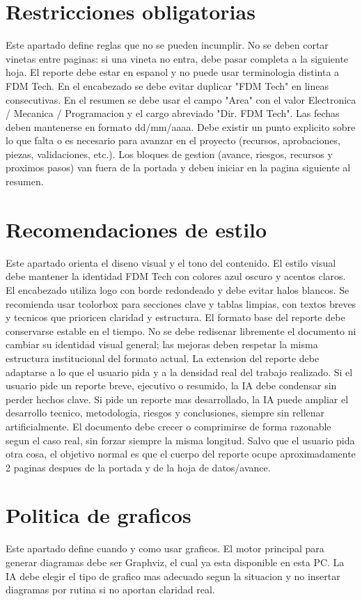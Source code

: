 \documentclass[11pt,a4paper]{article}
\begin{document}
\section{Restricciones obligatorias}
Este apartado define reglas que no se pueden incumplir. No se deben cortar
vinetas entre paginas: si una vineta no entra, debe pasar completa a la
siguiente hoja. El reporte debe estar en espanol y no puede usar terminologia
distinta a FDM Tech. En el encabezado se debe evitar duplicar "FDM Tech" en
lineas consecutivas. En el resumen se debe usar el campo "Area" con el valor
Electronica / Mecanica / Programacion y el cargo abreviado "Dir. FDM Tech".
Las fechas deben mantenerse en formato dd/mm/aaaa. Debe existir un punto
explicito sobre lo que falta o es necesario para avanzar en el proyecto
(recursos, aprobaciones, piezas, validaciones, etc.). Los bloques de gestion
(avance, riesgos, recursos y proximos pasos) van fuera de la portada y deben
iniciar en la pagina siguiente al resumen.

\section{Recomendaciones de estilo}
Este apartado orienta el diseno visual y el tono del contenido. El estilo
visual debe mantener la identidad FDM Tech con colores azul oscuro y acentos claros.
El encabezado utiliza logo con borde redondeado y debe evitar halos blancos.
Se recomienda usar tcolorbox para secciones clave y tablas limpias, con textos
breves y tecnicos que prioricen claridad y estructura.
El formato base del reporte debe conservarse estable en el tiempo. No se debe
redisenar libremente el documento ni cambiar su identidad visual general; las
mejoras deben respetar la misma estructura institucional del formato actual.
La extension del reporte debe adaptarse a lo que el usuario pida y a la
densidad real del trabajo realizado. Si el usuario pide un reporte breve,
ejecutivo o resumido, la IA debe condensar sin perder hechos clave. Si pide un
reporte mas desarrollado, la IA puede ampliar el desarrollo tecnico,
metodologia, riesgos y conclusiones, siempre sin rellenar artificialmente.
El documento debe crecer o comprimirse de forma razonable segun el caso real,
sin forzar siempre la misma longitud. Salvo que el usuario pida otra cosa, el
objetivo normal es que el cuerpo del reporte ocupe aproximadamente 2 paginas
despues de la portada y de la hoja de datos/avance.

\section{Politica de graficos}
Este apartado define cuando y como usar graficos. El motor principal para
generar diagramas debe ser Graphviz, el cual ya esta disponible en esta PC. La
IA debe elegir el tipo de grafico mas adecuado segun la situacion y no insertar
diagramas por rutina si no aportan claridad real.
\end{document}
